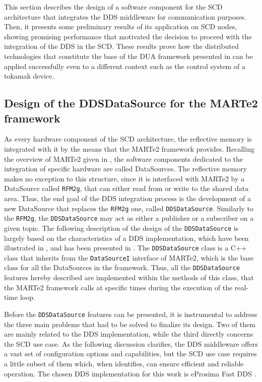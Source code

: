 This section describes the design of a software component for the SCD architecture that integrates the DDS middleware for communication purposes. Then, it presents some preliminary results of its application on SCD nodes, showing promising performance that motivated the decision to proceed with the integration of the DDS in the SCD. These results prove how the distributed technologies that constitute the base of the DUA framework presented in  can be applied successfully even to a different context such as the control system of a tokamak device.

\subsection{Design of the DDSDataSource for the MARTe2 framework}
\label{sec:ddsdatasource}
As every hardware component of the SCD architecture, the reflective memory is integrated with it by the means that the MARTe2 framework provides. Recalling the overview of MARTe2 given in , the software components dedicated to the integration of specific hardware are called DataSources. The reflective memory makes no exception to this structure, since it is interfaced with MARTe2 by a DataSource called \texttt{RFM2g}, that can either read from or write to the shared data area. Thus, the end goal of the DDS integration process is the development of a new DataSource that replaces the \texttt{RFM2g} one, called \texttt{DDSDataSource}. Similarly to the \texttt{RFM2g}, the \texttt{DDSDataSource} may act as either a publisher or a subscriber on a given topic. The following description of the design of the \texttt{DDSDataSource} is largely based on the characteristics of a DDS implementation, which have been illustrated in , and has been presented in \cite{masocco_distributed_2024}. The \texttt{DDSDataSource} class is a C++ class that inherits from the \texttt{DataSourceI} interface of MARTe2, which is the base class for all the DataSources in the framework. Thus, all the \texttt{DDSDataSource} features hereby described are implemented within the methods of this class, that the MARTe2 framework calls at specific times during the execution of the real-time loop.

Before the \texttt{DDSDataSource} features can be presented, it is instrumental to address the three main problems that had to be solved to finalize its design. Two of them are mainly related to the DDS implementation, while the third directly concerns the SCD use case. As the following discussion clarifies, the DDS middleware offers a vast set of configuration options and capabilities, but the SCD use case requires a little subset of them which, when identifies, can ensure efficient and reliable operation. The chosen DDS implementation for this work is eProsima Fast DDS \cite{eprosima_fast_nodate}.

